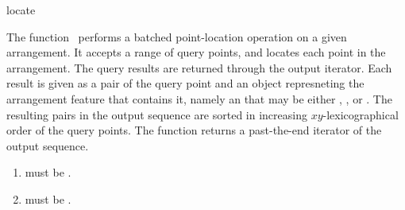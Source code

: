 \ccRefPageBegin

\begin{ccRefFunction}{locate}

\ccDefinition

The function \ccRefName\ performs a batched point-location operation on a
given arrangement. It accepts a range of query points, and locates each
point in the arrangement. The query results are returned through the output
iterator. Each result is given as a pair of the query point and an object
represneting the arrangement feature that contains it, namely an
 that may be either ,
, or . The resulting
pairs in the output sequence are sorted in increasing $xy$-lexicographical
order of the query points. The function returns a past-the-end iterator of
the output sequence.



\begin{enumerate}
\item {} must be .
\item {} must be
  .
\end{enumerate}

\end{ccRefFunction}

\ccRefPageEnd
